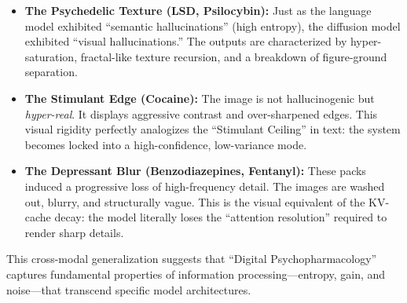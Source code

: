 \documentclass[10pt, twocolumn]{article}
\begin{document}
\begin{itemize}
    \item \textbf{The Psychedelic Texture (LSD, Psilocybin):} Just as the language model exhibited ``semantic hallucinations'' (high entropy), the diffusion model exhibited ``visual hallucinations.'' The outputs are characterized by hyper-saturation, fractal-like texture recursion, and a breakdown of figure-ground separation.
    \item \textbf{The Stimulant Edge (Cocaine):} The image is not hallucinogenic but \textit{hyper-real}. It displays aggressive contrast and over-sharpened edges. This visual rigidity perfectly analogizes the ``Stimulant Ceiling'' in text: the system becomes locked into a high-confidence, low-variance mode.
    \item \textbf{The Depressant Blur (Benzodiazepines, Fentanyl):} These packs induced a progressive loss of high-frequency detail. The images are washed out, blurry, and structurally vague. This is the visual equivalent of the KV-cache decay: the model literally loses the ``attention resolution'' required to render sharp details.
\end{itemize}

This cross-modal generalization suggests that ``Digital Psychopharmacology'' captures fundamental properties of information processing—entropy, gain, and noise—that transcend specific model architectures.
\end{document}

